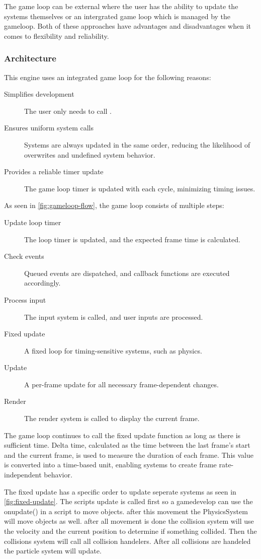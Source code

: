 \documentclass{projdoc}
\begin{document}
The game loop can be external where the user has the ability to update the systems
themselves or an intergrated game loop which is managed by the gameloop. Both of
these approaches have advantages and disadvantages when it comes to flexibility and
reliability.
\subsubsection{Architecture}

This engine uses an integrated game loop for the following reasons:\noparbreak
\begin{description}
	\item[Simplifies development] The user only needs to call .
	\item[Ensures uniform system calls] Systems are always updated in the same order,
		reducing the likelihood of overwrites and undefined system behavior.
	\item[Provides a reliable timer update] The game loop timer is updated with each
		cycle, minimizing timing issues.
\end{description}

As seen in \cref{fig:gameloop-flow}, the game loop consists of multiple
steps:\noparbreak
\begin{description}
	\item[Update loop timer] The loop timer is updated, and the expected frame time is
		calculated.
	\item[Check events] Queued events are dispatched, and callback functions are
		executed accordingly.
	\item[Process input] The input system is called, and user inputs are processed.
	\item[Fixed update] A fixed loop for timing-sensitive systems, such as physics.
	\item[Update] A per-frame update for all necessary frame-dependent changes.
	\item[Render] The render system is called to display the current frame.
\end{description}

The game loop continues to call the fixed update function as long as there is
sufficient time. Delta time, calculated as the time between the last frame’s start
and the current frame, is used to measure the duration of each frame. This value is
converted into a time-based unit, enabling systems to create frame rate-independent
behavior.

The fixed update has a specific order to update seperate systems as seen in
\cref{fig:fixed-update}. The scripts update is called first so a gamedevelop can use
the onupdate() in a script to move objects. after this movement the PhysicsSystem
will move objects as well. after all movement is done the collision system will use
the velocity and the current position to determine if something collided. Then the
collisions system will call all collision handelers. After all collisions are
handeled the particle system will update.
\end{document}
